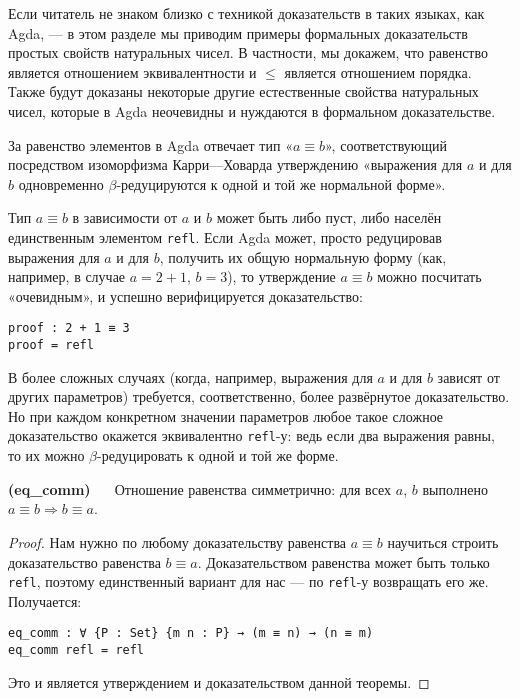 

\abz Если читатель не знаком близко с техникой доказательств в таких языках, как Agda, — в этом разделе мы приводим примеры формальных доказательств простых свойств натуральных чисел. В частности, мы докажем, что равенство является отношением эквивалентности и $\le$ является отношением порядка. Также будут доказаны некоторые другие естественные свойства натуральных чисел, которые в Agda неочевидны и нуждаются в формальном доказательстве.

\abz За равенство элементов в Agda отвечает тип «$a \equiv b$», соответствующий посредством изоморфизма Карри—Ховарда утверждению «выражения для $a$ и для $b$ одновременно $\beta$-редуцируются к одной и той же нормальной форме».

\abz Тип $a \equiv b$ в зависимости от $a$ и $b$ может быть либо пуст, либо населён единственным элементом {\tt refl}. Если Agda может, просто редуцировав выражения для $a$ и для $b$, получить их общую нормальную форму (как, например, в случае $a = 2+1$, $b = 3$), то утверждение $a \equiv b$ можно посчитать «очевидным», и успешно верифицируется доказательство:

\begin{verbatim}
proof : 2 + 1 ≡ 3
proof = refl
\end{verbatim}

\abz В более сложных случаях (когда, например, выражения для $a$ и для $b$ зависят от других параметров) требуется, соответственно, более развёрнутое доказательство. Но при каждом конкретном значении параметров любое такое сложное доказательство окажется эквивалентно {\tt refl}-у: ведь если два выражения равны, то их можно $\beta$-редуцировать к одной и той же форме.

\begin{stat}
\label{eq_comm}
	{\bf (eq\_comm)\ \ \ }Отношение равенства симметрично: для всех $a$, $b$ выполнено\ \ 
	$a \equiv b \Longrightarrow b \equiv a$.
\end{stat}

\begin{proof}
	Нам нужно по любому доказательству равенства $a \equiv b$ научиться строить доказательство равенства $b \equiv a$. Доказательством равенства может быть только {\tt refl}, поэтому единственный вариант для нас — по {\tt refl}-у возвращать его же. Получается:

\begin{verbatim}
eq_comm : ∀ {P : Set} {m n : P} → (m ≡ n) → (n ≡ m)
eq_comm refl = refl
\end{verbatim}

\noindent Это и является утверждением и доказательством данной теоремы.\end{proof}

